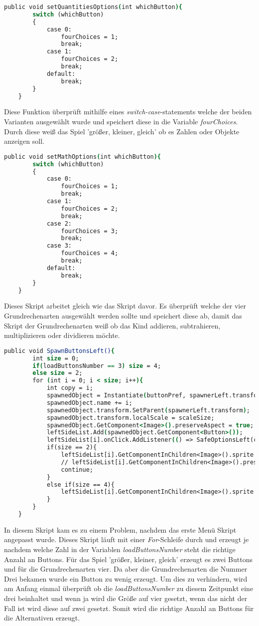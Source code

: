 \begin{lstlisting}[language=csh, caption={MenuPickLevelAdvanced.cs setQuantitiesOptions-Funktion}]
	public void setQuantitiesOptions(int whichButton){
		switch (whichButton)
		{
			case 0:
				fourChoices = 1;
				break;
			case 1:
				fourChoices = 2;
				break;
			default:
				break;
		}
	}
\end{lstlisting}
Diese Funktion überprüft mithilfe eines \textit{switch-case}-statements welche der beiden Varianten ausgewählt wurde und speichert diese in die Variable \textit{fourChoices}. Durch diese weiß das Spiel 'größer, kleiner, gleich' ob es Zahlen oder Objekte anzeigen soll.
\begin{lstlisting}[language=csh, caption={MenuPickLevelAdvanced.cs setMathOptions-Funktion}]
	public void setMathOptions(int whichButton){
		switch (whichButton)
		{
			case 0:
				fourChoices = 1;
				break;
			case 1:
				fourChoices = 2;
				break;
			case 2:
				fourChoices = 3;
				break;
			case 3:
				fourChoices = 4;
				break;
			default:
				break;
		}
	}
\end{lstlisting}
Dieses Skript arbeitet gleich wie das Skript davor. Es überprüft welche der vier Grundrechenarten ausgewählt werden sollte und speichert diese ab, damit das Skript der Grundrechenarten weiß ob das Kind addieren, subtrahieren, multiplizieren oder dividieren möchte.
\begin{lstlisting}[language=csh, caption={MenuPickLevelAdvanced.cs SpawnButtonsLeft-Funktion}]
	public void SpawnButtonsLeft(){
		int size = 0;
		if(loadButtonsNumber == 3) size = 4;
		else size = 2;
		for (int i = 0; i < size; i++){
			int copy = i;
			spawnedObject = Instantiate(buttonPref, spawnerLeft.transform.position, Quaternion.identity);
			spawnedObject.name += i;
			spawnedObject.transform.SetParent(spawnerLeft.transform);
			spawnedObject.transform.localScale = scaleSize;
			spawnedObject.GetComponent<Image>().preserveAspect = true;
			leftSideList.Add(spawnedObject.GetComponent<Button>());
			leftSideList[i].onClick.AddListener(() => SafeOptionsLeft(copy));
			if(size == 2){
				leftSideList[i].GetComponentInChildren<Image>().sprite = quantitiesModes[i];
				// leftSideList[i].GetComponentInChildren<Image>().preserveAspect = true;
				continue;
			}
			else if(size == 4){
				leftSideList[i].GetComponentInChildren<Image>().sprite = mathModes[i];
			}
		}
	}
\end{lstlisting}
In diesem Skript kam es zu einem Problem, nachdem das erste Menü Skript angepasst wurde. Dieses Skript läuft mit einer \textit{For}-Schleife durch und erzeugt je nachdem welche Zahl in der Variablen \textit{loadButtonsNumber} steht die richtige Anzahl an Buttons. Für das Spiel 'größer, kleiner, gleich' erzeugt es zwei Buttons und für die Grundrechenarten vier. Da aber die Grundrechenarten die Nummer Drei bekamen wurde ein Button zu wenig erzeugt. Um dies zu verhindern, wird am Anfang einmal überprüft ob die \textit{loadButtonsNumber} zu diesem Zeitpunkt eine drei beinhaltet und wenn ja wird die Größe auf vier gesetzt, wenn das nicht der Fall ist wird diese auf zwei gesetzt. Somit wird die richtige Anzahl an Buttons für die Alternativen erzeugt.\\
